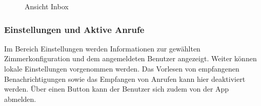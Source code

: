 \begin{figure}[h]
\begin{minipage}[b]{0.4\textwidth}
        \caption{Ansicht Inbox}
    \end{minipage}
    \label{fig:MobileClient-Screens2}
\end{figure}

\clearpage

\subsubsection{Einstellungen und Aktive Anrufe}

Im Bereich Einstellungen werden Informationen zur gewählten Zimmerkonfiguration und dem angemeldeten Benutzer angezeigt.
Weiter können lokale Einstellungen vorgenommen werden.
Das Vorlesen von empfangenen Benachrichtigungen sowie das Empfangen von Anrufen kann hier deaktiviert werden.
Über einen Button kann der Benutzer sich zudem von der App abmelden.

